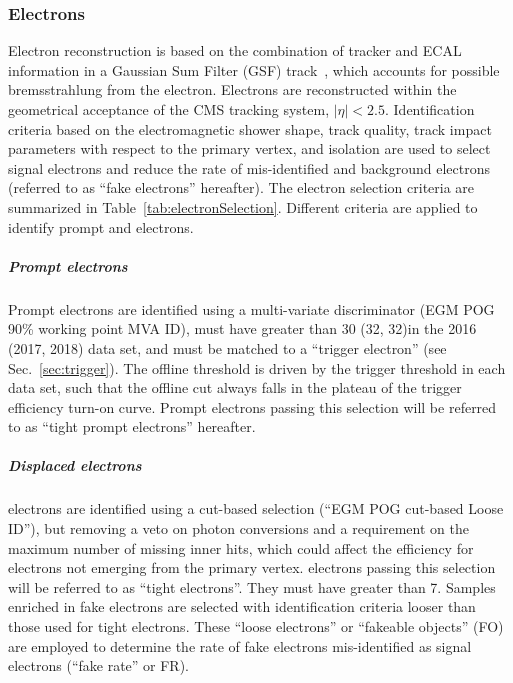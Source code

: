 \subsubsection{Electrons}\label{sec:llelectron}
Electron reconstruction is based on the combination of tracker and
ECAL information in a Gaussian Sum Filter (GSF)
track~\cite{Khachatryan:2015hwa}, which accounts for possible
bremsstrahlung from the electron.
Electrons are reconstructed within the geometrical acceptance of the
CMS tracking system, $|\eta|<2.5$.
Identification criteria based on the electromagnetic shower shape, track
quality, track impact parameters with respect to the primary vertex,
and isolation are used to select signal electrons and reduce the rate
of mis-identified and background electrons (referred to as ``fake
electrons'' hereafter).
The electron selection criteria are summarized in
Table~\ref{tab:electronSelection}. 
Different criteria are applied to identify prompt and \displ
electrons.
\subparagraph {Prompt electrons}
Prompt electrons are identified using a multi-variate discriminator
(EGM POG 90\% working point MVA ID),
must have \pt greater than 30 (32, 32)\GeV in the 2016 (2017, 2018)
data set,
and must be matched to a ``trigger electron'' (see
Sec.~\ref{sec:trigger}).
The offline \pt threshold is driven by the trigger \pt threshold in
each data set, such that the offline cut always falls in the plateau
of the trigger efficiency turn-on curve.
Prompt electrons passing this selection will be referred to as ``tight
prompt electrons'' hereafter.
\subparagraph {Displaced electrons}
\Displ electrons are identified using a cut-based selection (``EGM
POG cut-based Loose ID''), but removing a veto
on photon conversions and a requirement on the maximum number of
missing inner hits, which could affect the efficiency for electrons
not emerging from the primary vertex.
\Displ electrons passing this selection will be referred to as
``tight \displ electrons''.
They must have \pt greater than 7\GeV.
Samples enriched in fake electrons are selected with
identification criteria looser than those used for tight \displ
electrons. These ``loose \displ electrons'' or ``fakeable objects''
(FO) are employed to determine the rate of fake electrons
mis-identified as signal electrons (``fake rate'' or FR).
